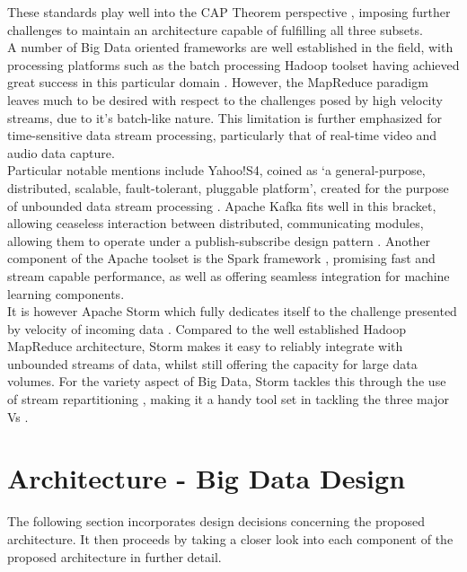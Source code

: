 \documentclass[10pt,conference]{IEEEtran}
\begin{document}
These standards play well into the CAP Theorem perspective \cite{CAPTheorem}, imposing further challenges to maintain an architecture capable of fulfilling all three subsets.
\\
A number of Big Data oriented frameworks are well established in the field, with processing platforms such as the batch processing Hadoop toolset having achieved great success in this particular domain \cite{VideoCloudPlatform, Hadoop}. However, the MapReduce paradigm leaves much to be desired with respect to the challenges posed by high velocity streams, due to it’s batch-like nature. This limitation is further emphasized for time-sensitive data stream processing, particularly that of real-time video and audio data capture.
\\
Particular notable mentions include Yahoo!S4, coined as ‘a general-purpose, distributed, scalable, fault-tolerant, pluggable platform’, created for the purpose of unbounded data stream processing \cite{VideoCloudPlatform}. Apache Kafka fits well in this bracket, allowing ceaseless interaction between distributed, communicating modules, allowing them to operate under a publish-subscribe design pattern \cite{Kafka}. Another component of the Apache toolset is the Spark framework \cite{UnifiedEngine}, promising fast and stream capable performance, as well as offering seamless integration for machine learning components.
\\
It is however Apache Storm which fully dedicates itself to the challenge presented by velocity of incoming data \cite{Storm}. Compared to the well established Hadoop MapReduce architecture, Storm makes it easy to reliably integrate with unbounded streams of data, whilst still offering the capacity for large data volumes. For the variety aspect of Big Data, Storm tackles this through the use of stream repartitioning \cite{VideoCloudPlatform}, making it a handy tool set in tackling the three major Vs \cite{DeepIntelligenceFramework, CAPTheorem}.

\section{Architecture - Big Data Design}
The following section incorporates design decisions concerning the proposed architecture. It then proceeds by taking a closer look into each component of the proposed architecture in further detail.
\end{document}
